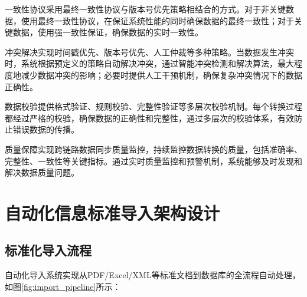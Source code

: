 一致性协议采用最终一致性协议与版本号优先策略相结合的方式。对于非关键数据，使用最终一致性协议，在保证系统性能的同时确保数据的最终一致性；对于关键数据，使用强一致性保证，确保数据的实时一致性。

冲突解决实现时间戳优先、版本号优先、人工仲裁等多种策略。当数据发生冲突时，系统根据预定义的策略自动解决冲突，通过智能冲突检测和解决算法，最大程度地减少数据冲突的影响；必要时提供人工干预机制，确保复杂冲突情况下的数据正确性。

数据校验提供格式验证、规则校验、完整性验证等多层次校验机制。每个转换过程都经过严格的校验，确保数据的正确性和完整性，通过多层次的校验体系，有效防止错误数据的传播。

质量保障实现跨链路数据同步质量监控，持续监控数据转换的质量，包括准确率、完整性、一致性等关键指标。通过实时质量监控和预警机制，系统能够及时发现和解决数据质量问题。

\section{自动化信息标准导入架构设计}

\subsection{标准化导入流程}

自动化导入系统实现从PDF/Excel/XML等标准文档到数据库的全流程自动处理，如图\ref{fig:import_pipeline}所示：

